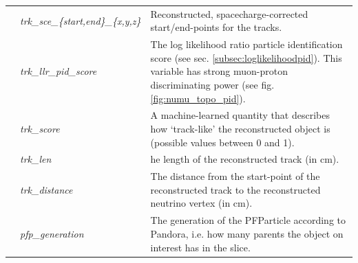 \begin{table}[ht]
\begin{tabular}{ m{} | m{} | m{}  }
\multicolumn{1}{l|}{} & \emph{trk\_sce\_\{start,end\}\_\{x,y,z\}} &  Reconstructed, spacecharge-corrected start/end-points for the tracks.\\  \cline{2-3}
\multicolumn{1}{l|}{} & \emph{trk\_llr\_pid\_score} &  The log likelihood ratio particle identification score (see sec. \ref{subsec:loglikelihoodpid}). This variable has strong muon-proton discriminating power (see fig. \ref{fig:numu_topo_pid}).\\  \cline{2-3}
\multicolumn{1}{l|}{} & \emph{trk\_score} & A machine-learned quantity that describes how `track-like' the reconstructed object is (possible values between 0 and 1). \\  \cline{2-3}
\parbox[t]{2mm}{} & \emph{trk\_len} & he length of the reconstructed track (in cm). \\  
 & \emph{trk\_distance} & The distance from the start-point of the reconstructed track to the reconstructed neutrino vertex (in cm). \\  
 & \emph{pfp\_generation} & The generation of the PFParticle according to Pandora, i.e. how many parents the object on interest has in the slice.\\  
\hline

\end{tabular}
\label{tab:numuvariableSummary}
\end{table}

